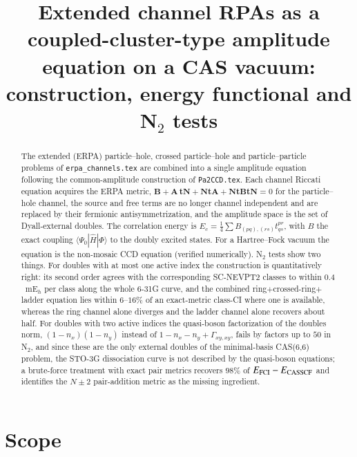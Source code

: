 \documentclass[aip,jcp,reprint,noshowkeys,superscriptaddress]{revtex4-1}
\newcommand{\bA}{\boldsymbol{A}}
\newcommand{\bB}{\boldsymbol{B}}
\newcommand{\bN}{\boldsymbol{N}}
\newcommand{\bt}{\boldsymbol{t}}
\begin{document}
\title{Extended channel RPAs as a coupled-cluster-type amplitude equation on a CAS vacuum:\\ construction, energy functional and N$_2$ tests}

\begin{abstract}
The extended (ERPA) particle--hole, crossed particle--hole and particle--particle
problems of \texttt{erpa\_channels.tex} are combined into a single amplitude
equation following the common-amplitude construction of \texttt{Pa2CCD.tex}.
Each channel Riccati equation acquires the ERPA metric,
$\bB+\bA\,\bt\bN+\bN\bt\bA+\bN\bt\bB\bt\bN=0$ for the particle--hole channel,
the source and free terms are no longer channel independent and are replaced
by their fermionic antisymmetrization, and the amplitude space is the set of
Dyall-external doubles.  The correlation energy is
$E_c=\tfrac14\sum B_{(pq),(rs)}t^{pr}_{qs}$, with $B$ the exact coupling
$\langle\Psi_0|\hat H|\Phi\rangle$ to the doubly excited states.  For a
Hartree--Fock vacuum the equation is the non-mosaic CCD equation (verified
numerically).  N$_2$ tests show two things.  For doubles with at most one
active index the construction is quantitatively right: its second order
agrees with the corresponding SC-NEVPT2 classes to within $0.4$~mE$_h$ per
class along the whole 6-31G curve, and the combined
ring$+$crossed-ring$+$ladder equation lies within $6$--$16\%$ of an
exact-metric class-CI where one is available, whereas the ring channel alone
diverges and the ladder channel alone recovers about half.  For doubles with
two active indices the quasi-boson factorization of the doubles norm,
$(1-n_x)(1-n_y)$ instead of $1-n_x-n_y+\Gamma_{xy,xy}$, fails by factors up
to $50$ in N$_2$, and since these are the only external doubles of the
minimal-basis CAS(6,6) problem, the STO-3G dissociation curve is not
described by the quasi-boson equations; a brute-force treatment with exact
pair metrics recovers $98\%$ of $E_{\rm FCI}-E_{\rm CASSCF}$ and identifies the
$N\pm2$ pair-addition metric as the missing ingredient.
\end{abstract}

\maketitle

\section{Scope}
\label{sec:scope}
\end{document}
